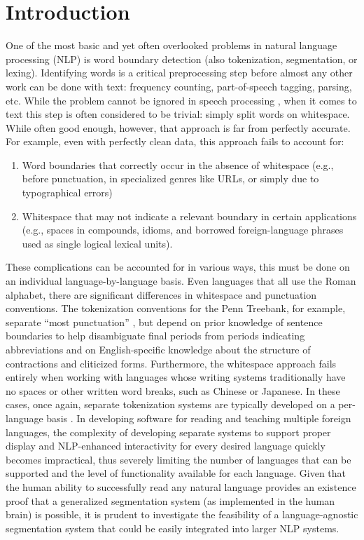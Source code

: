 \chapter{Introduction}
One of the most basic and yet often overlooked problems in natural language processing (NLP) is word boundary detection (also tokenization, segmentation, or lexing). Identifying words is a critical preprocessing step before almost any other work can be done with text: frequency counting, part-of-speech tagging, parsing, etc. While the problem cannot be ignored in speech processing \cite{varile96}, when it comes to text this step is often considered to be trivial: simply split words on whitespace. While often good enough, however, that approach is far from perfectly accurate. For example, even with perfectly clean data, this approach fails to account for:
\begin{enumerate}
	\item Word boundaries that correctly occur in the absence of whitespace (e.g., before punctuation, in specialized genres like URLs, or simply due to typographical errors)
	\item Whitespace that may not indicate a relevant boundary in certain applications (e.g., spaces in compounds, idioms, and borrowed foreign-language phrases used as single logical lexical units).
\end{enumerate}
These complications can be accounted for in various ways, this must be done on an individual language-by-language basis. Even languages that all use the Roman alphabet, there are significant differences in whitespace and punctuation conventions. The tokenization conventions for the Penn Treebank, for example, separate “most punctuation” \cite{treebank}, but depend on prior knowledge of sentence boundaries to help disambiguate final periods from periods indicating abbreviations and on English-specific knowledge about the structure of contractions and cliticized forms. Furthermore, the whitespace approach fails entirely when working with languages whose writing systems traditionally have no spaces or other written word breaks, such as Chinese or Japanese. In these cases, once again, separate tokenization systems are typically developed on a per-language basis \cite{peng04} \cite{suzuki00}.
In developing software for reading and teaching multiple foreign languages, the complexity of developing separate systems to support proper display and NLP-enhanced interactivity for every desired language quickly becomes impractical, thus severely limiting the number of languages that can be supported and the level of functionality available for each language. Given that the human ability to successfully read any natural language provides an existence proof that a generalized segmentation system (as implemented in the human brain) is possible, it is prudent to investigate the feasibility of a language-agnostic segmentation system that could be easily integrated into larger NLP systems.
